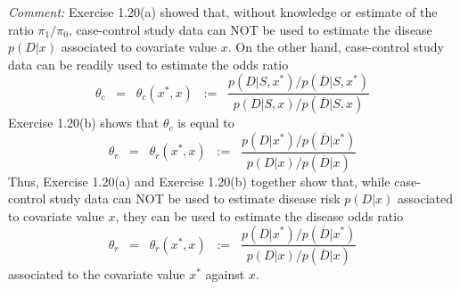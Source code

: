 \vskip 0.5cm
\noindent
\textit{Comment:}\quad
Exercise 1.20(a) showed that, without knowledge or estimate of the ratio $\pi_{1}/\pi_{0}$,
case-control study data can NOT be used to estimate the disease $p(D \vert x)$ associated to
covariate value $x$.
On the other hand, case-control study data can be readily used to estimate the odds ratio
\begin{equation*}
\theta_{c}
\;\; = \;\;
\theta_{c}(x^{*},x)
\;\; := \;\;
\dfrac{
p(D \vert S,x^{*}) / p(\overline{D} \vert S,x^{*})
}{
p(D \vert S,x) / p(\overline{D} \vert S,x)
}
\end{equation*}
Exercise 1.20(b) shows that $\theta_{c}$ is equal to
\begin{equation*}
\theta_{r}
\;\; = \;\;
\theta_{r}(x^{*},x)
\;\; := \;\;
\dfrac{
p(D \vert x^{*}) / p(\overline{D} \vert x^{*})
}{
p(D \vert x) / p(\overline{D} \vert x)
}
\end{equation*}
Thus, Exercise 1.20(a) and Exercise 1.20(b) together show that, while case-control study data can
NOT be used to estimate disease risk $p(D \vert x)$ associated to covariate value $x$, they can
be used to estimate the disease odds ratio
\begin{equation*}
\theta_{r}
\;\; = \;\;
\theta_{r}(x^{*},x)
\;\; := \;\;
\dfrac{
p(D \vert x^{*}) / p(\overline{D} \vert x^{*})
}{
p(D \vert x) / p(\overline{D} \vert x)
}
\end{equation*}
associated to the covariate value $x^{*}$ against $x$.


